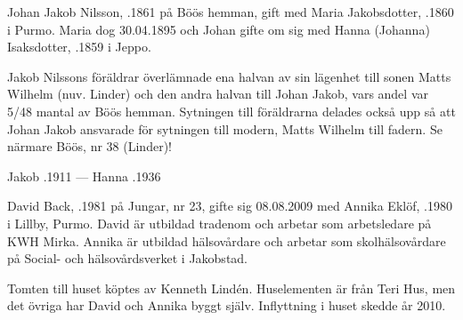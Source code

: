 Johan Jakob Nilsson, .1861 på Böös hemman, gift med Maria 	Jakobsdotter, .1860 i Purmo. Maria dog 30.04.1895  och Johan gifte om sig med Hanna (Johanna) Isaksdotter, .1859 i Jeppo.
\begin{jhchildren}
  \item {}
  \item {}
  \item {}
  \item {}
  \item {}
  \item {}
  \item {}
  \item {}
\end{jhchildren}
Jakob Nilssons föräldrar överlämnade ena halvan av sin lägenhet	till sonen Matts Wilhelm (nuv. Linder) och den andra halvan till Johan Jakob, vars andel var 5/48 mantal av Böös hemman. Sytningen till föräldrarna delades också upp så att Johan Jakob ansvarade för sytningen till modern, Matts Wilhelm till fadern. Se närmare Böös, nr 38 (Linder)!

Jakob .1911  ---  Hanna .1936






David Back, .1981 på Jungar, nr 23, gifte sig 08.08.2009 med Annika Eklöf, .1980 i Lillby, Purmo. David är utbildad tradenom och arbetar som arbetsledare på KWH Mirka. Annika är	utbildad hälsovårdare och arbetar som skolhälsovårdare på Social- och hälsovårdsverket i Jakobstad.
\begin{jhchildren}
  \item {}
  \item {}
\end{jhchildren}
Tomten till huset köptes av Kenneth Lindén. Huselementen är från Teri Hus, men det övriga har David och Annika byggt själv. Inflyttning i huset skedde år 2010.



